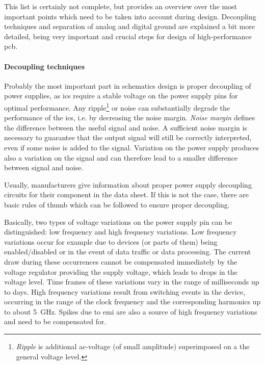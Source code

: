 This list is certainly not complete, but provides an overview over the most important points which need to be taken into account during design.
Decoupling techniques and separation of analog and digital ground are explained a bit more detailed, being very important and crucial steps for design of high-performance \gls{pcb}.
 
\paragraph{Decoupling techniques}
Probably the most important part in schematics design is proper decoupling of power supplies, as \glspl{ic} require a stable voltage on the power supply pins for optimal performance.
Any ripple\footnote{\textit{Ripple} is additional \gls{ac}-voltage (of small amplitude) superimposed on a the general voltage level.} or noise can substantially degrade the performance of the \glspl{ic}, i.e. by decreasing the noise margin.
\textit{Noise margin} defines the difference between the useful signal and noise. 
A sufficient noise margin is necessary to guarantee that the output signal will still be correctly interpreted, even if some noise is added to the signal.
Variation on the power supply produces also a variation on the signal and can therefore lead to a smaller difference between signal and noise.

Usually, manufacturers give information about proper power supply decoupling circuits for their component in the data sheet.
If this is not the case, there are basic rules of thumb which can be followed to ensure proper decoupling. \cite{decouple}

Basically, two types of voltage variations on the power supply pin can be distinguished: low frequency and high frequency variations.
Low frequency variations occur for example due to devices (or parts of them) being enabled/disabled or in the event of data traffic or data processing.
The current draw during these occurrences cannot be compensated immediately by the voltage regulator providing the supply voltage, which leads to drops in the voltage level.
Time frames of these variations vary in the range of milliseconds up to days.
High frequency variations result from switching events in the device, occurring in the range of the clock frequency and the corresponding harmonics up to about \SI{5}{\giga \hertz}.
Spikes due to \gls{emi} are also a source of high frequency variations and need to be compensated for. \cite{xilDecouple} 

